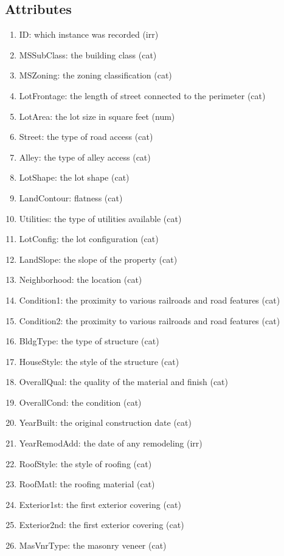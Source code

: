\documentclass[12pt]{article}
\begin{document}
\subsection{Attributes}
\begin{enumerate}
\setlength{\itemsep}{-1mm}
\item ID: which instance was recorded (irr)
\item MSSubClass: the building class (cat)
\item MSZoning: the zoning classification (cat)
\item LotFrontage: the length of street connected to the perimeter (cat)
\item LotArea: the lot size in square feet (num)
\item Street: the type of road access (cat)
\item Alley: the type of alley access (cat)
\item LotShape: the lot shape (cat)
\item LandContour: flatness (cat)
\item Utilities: the type of utilities available (cat)
\item LotConfig: the lot configuration (cat)
\item LandSlope: the slope of the property (cat)
\item Neighborhood: the location (cat)
\item Condition1: the proximity to various railroads and road features (cat)
\item Condition2: the proximity to various railroads and road features (cat)
\item BldgType: the type of structure (cat)
\item HouseStyle: the style of the structure (cat)
\item OverallQual: the quality of the material and finish (cat)
\item OverallCond: the condition (cat)
\item YearBuilt: the original construction date (cat)
\item YearRemodAdd: the date of any remodeling (irr)
\item RoofStyle: the style of roofing (cat)
\item RoofMatl: the roofing material (cat)
\item Exterior1st: the first exterior covering (cat)
\item Exterior2nd: the first exterior covering (cat)
\item MasVnrType: the masonry veneer (cat)

\end{enumerate}
\end{document}
